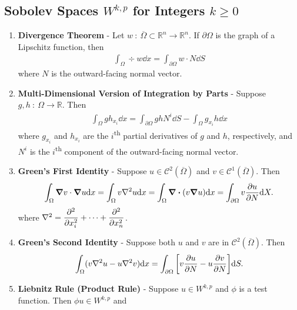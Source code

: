 \documentclass{article}
\newcommand{\Rl}{\mathbb{R}}
\begin{document}
    \subsection{Sobolev Spaces $W^{k,p}$ for Integers $k \geq 0$}
    \begin{enumerate}
        \item
            \textbf{Divergence Theorem} - Let $w\ :\ \overline{\Omega} \subset \Rl^n \rightarrow \Rl^n$.  If $\partial\Omega$ is the graph of a Lipschitz function, then
            \begin{align*}
                \int_\Omega \div w \dd x = \int_{\partial \Omega} w \cdot N \dd S
            \end{align*}
            where $N$ is the outward-facing normal vector.
        \item
            \textbf{Multi-Dimensional Version of Integration by Parts} - Suppose $g,h\ :\ \Omega \rightarrow \Rl$.  Then
            \begin{align*}
                \int_\Omega g h_{x_i} \dd x = \int_{\partial\Omega} gh N^i \dd S - \int_\Omega g_{x_i}h \dd x
            \end{align*}
            where $g_{x_i}$ and $h_{x_i}$ are the $i$\textsuperscript{th} partial derivatives of $g$ and $h$, respectively, and $N^i$ is the $i$\textsuperscript{th} component of the outward-facing normal vector.
        \item
            \textbf{Green's First Identity} - Suppose $u \in \mathcal{C}^2(\overline{\Omega})$ and $v \in \mathcal{C}^1(\overline{\Omega})$.  Then
            \begin{align*}
                \int_\Omega \grad v \cdot \grad u \dd x = \int_\Omega v \laplacian u \dd x = \int_\Omega \div\qty(v\grad u) \dd x = \int_{\partial\Omega} v \frac{\partial u}{\partial N}\dd X.
            \end{align*}
            where $\laplacian = \dfrac{\partial^2}{\partial x_i^2} + \dots + \dfrac{\partial^2}{\partial x_n^2}$.
        \item
            \textbf{Green's Second Identity} - Suppose both $u$ and $v$ are in $\mathcal{C}^2(\overline{\Omega})$.  Then
            \begin{align*}
                \int_\Omega (v \laplacian u - u \laplacian v) \dd x = \int_{\partial \Omega} \qty[v \frac{\partial u}{\partial N} - u \frac{\partial v}{\partial N}]\dd S.
            \end{align*}
        \item
            \textbf{Liebnitz Rule (Product Rule)} - Suppose $u \in W^{k,p}$ and $\phi$ is a test function.  Then $\phi u \in W^{k,p}$ and

\end{enumerate}
\end{document}
